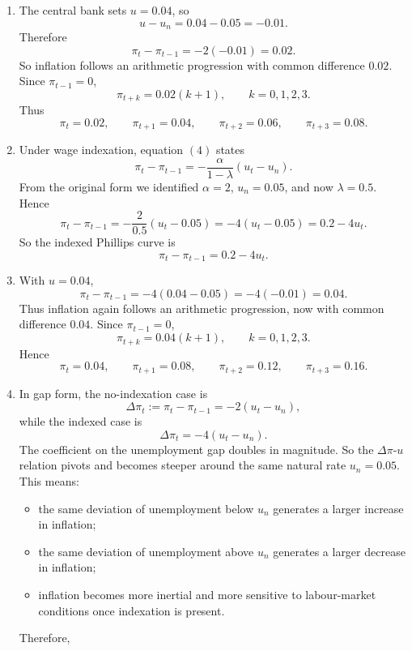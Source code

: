 \documentclass[12pt]{article}
\begin{document}
\begin{enumerate}[label=(\alph*)]
    \item
    The central bank sets \(u=0.04\), so
    \[
    u-u_n=0.04-0.05=-0.01.
    \]
    Therefore
    \[
    \pi_t-\pi_{t-1}=-2(-0.01)=0.02.
    \]
    So inflation follows an arithmetic progression with common difference \(0.02\). Since \(\pi_{t-1}=0\),
    \[
    \pi_{t+k}=0.02(k+1),\qquad k=0,1,2,3.
    \]
    Thus
    \[
    \boxed{\pi_t=0.02,\qquad \pi_{t+1}=0.04,\qquad \pi_{t+2}=0.06,\qquad \pi_{t+3}=0.08.}
    \]

    \item
    Under wage indexation, equation \((4)\) states
    \[
    \pi_t-\pi_{t-1}=-\frac{\alpha}{1-\lambda}(u_t-u_n).
    \]
    From the original form we identified \(\alpha=2\), \(u_n=0.05\), and now \(\lambda=0.5\). Hence
    \[
    \pi_t-\pi_{t-1}
    =
    -\frac{2}{0.5}(u_t-0.05)
    =
    -4(u_t-0.05)
    =
    0.2-4u_t.
    \]
    So the indexed Phillips curve is
    \[
    \boxed{\pi_t-\pi_{t-1}=0.2-4u_t.}
    \]

    \item
    With \(u=0.04\),
    \[
    \pi_t-\pi_{t-1}
    =
    -4(0.04-0.05)
    =
    -4(-0.01)
    =
    0.04.
    \]
    Thus inflation again follows an arithmetic progression, now with common difference \(0.04\). Since \(\pi_{t-1}=0\),
    \[
    \pi_{t+k}=0.04(k+1),\qquad k=0,1,2,3.
    \]
    Hence
    \[
    \boxed{\pi_t=0.04,\qquad \pi_{t+1}=0.08,\qquad \pi_{t+2}=0.12,\qquad \pi_{t+3}=0.16.}
    \]

    \item
    In gap form, the no-indexation case is
    \[
    \Delta \pi_t:=
    \pi_t-\pi_{t-1}
    =
    -2(u_t-u_n),
    \]
    while the indexed case is
    \[
    \Delta \pi_t=
    -4(u_t-u_n).
    \]
    The coefficient on the unemployment gap doubles in magnitude. So the \(\Delta\pi\)-\(u\) relation pivots and becomes steeper around the same natural rate \(u_n=0.05\). This means:
    \begin{itemize}[leftmargin=*]
        \item the same deviation of unemployment below \(u_n\) generates a larger increase in inflation;
        \item the same deviation of unemployment above \(u_n\) generates a larger decrease in inflation;
        \item inflation becomes more inertial and more sensitive to labour-market conditions once indexation is present.
    \end{itemize}
    Therefore,
    \begin{center}
    \end{center}
\end{enumerate}
\end{document}
